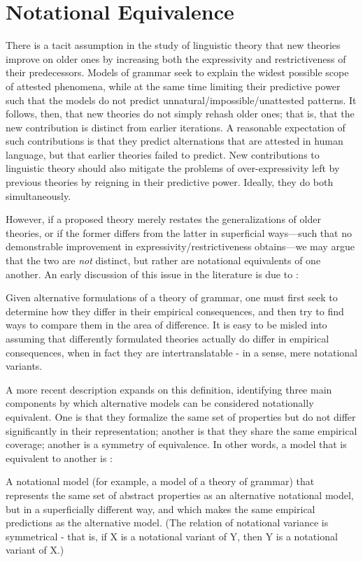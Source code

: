 \documentclass{article}
\begin{document}
\section{Notational Equivalence}
There is a tacit assumption in the study of linguistic theory that new theories improve on older ones by increasing both the expressivity and restrictiveness of their predecessors. Models of grammar seek to explain the widest possible scope of attested phenomena, while at the same time limiting their predictive power such that the models do not predict unnatural/impossible/unattested patterns. It follows, then, that new theories do not simply rehash older ones; that is, that the new contribution is distinct from earlier iterations. A reasonable expectation of such contributions is that they predict alternations that are attested in human language, but that earlier theories failed to predict. New contributions to linguistic theory should also mitigate the problems of over-expressivity left by previous theories by reigning in their predictive power. Ideally, they do both simultaneously. \par 
However, if a proposed theory merely restates the generalizations of older theories, or if the former differs from the latter in superficial ways---such that no demonstrable improvement in expressivity/restrictiveness obtains---we may argue that the two are \emph{not} distinct, but rather are notational equivalents of one another. An early discussion of this issue in the literature is due to \citet[p.~2]{Chomsky1972}:
\begin{displayquote}
Given alternative formulations of a theory of grammar, one must first seek to determine how they differ in their empirical consequences, and then try to find ways to compare them in the area of difference. It is easy to be misled into assuming that differently formulated theories actually do differ in empirical consequences, when in fact they are intertranslatable - in a sense, mere notational variants.
\end{displayquote}
A more recent description expands on this definition, identifying three main components by which alternative models can be considered notationally equivalent. One is that they formalize the same set of properties but do not differ significantly in their representation; another is that they share the same empirical coverage; another is a symmetry of equivalence. In other words, a model that is equivalent to another is \citep{Hayes2013}:
\begin{displayquote}
A notational model (for example, a model of a theory of grammar) that represents the same set of abstract properties as an alternative notational model, but in a superficially different way, and which makes the same empirical predictions as the alternative model. (The relation of notational variance is symmetrical - that is, if X is a notational variant of Y, then Y is a notational variant of X.)
\end{displayquote}
\end{document}
